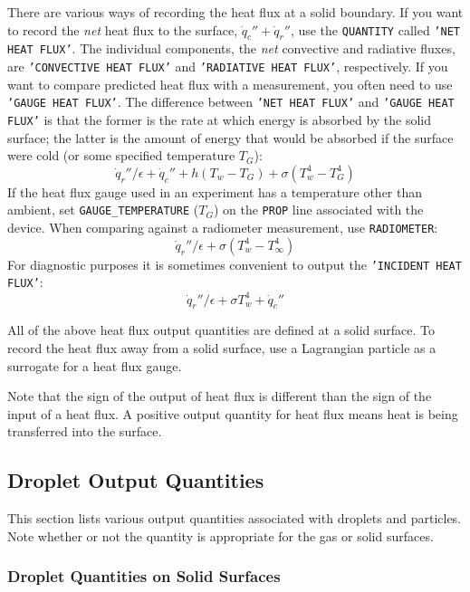 \documentclass[11pt]{book}
\newcommand{\ct}{\tt\small}
\newcommand{\dq}{\dot{q}}
\begin{document}
There are various ways of recording the heat flux at a solid
boundary. If you want to record the {\em net} heat flux to the
surface, $\dq_c'' + \dq_r''$, use the {\ct QUANTITY} called {\ct 'NET HEAT FLUX'}. The individual components, the {\em net} convective and
radiative fluxes, are {\ct 'CONVECTIVE HEAT FLUX'} and {\ct 'RADIATIVE HEAT FLUX'}, respectively. If you want to compare predicted heat
flux with a measurement, you often need to use {\ct 'GAUGE HEAT FLUX'}.
The difference between {\ct 'NET HEAT FLUX'} and {\ct 'GAUGE HEAT FLUX'} is that
the former is the rate at which energy is absorbed by the solid surface;
the latter is the amount of energy that would be absorbed if the surface were cold (or some specified temperature $T_G$):
$$\dq_r''/\epsilon +\dq_c'' + h(T_w-T_G) + \sigma (T_w^4-T_G^4)$$
If the heat flux gauge used in an experiment has a temperature other
than ambient, set {\ct GAUGE\_TEMPERATURE} ($T_G$) on the {\ct PROP} line
associated with the device.  When comparing against a radiometer
measurement, use {\ct RADIOMETER}:
$$\dq_r''/\epsilon + \sigma (T_w^4-T_\infty^4) $$
For diagnostic purposes it is sometimes convenient to output the {\ct 'INCIDENT HEAT FLUX'}:
$$ \dq_r''/\epsilon + \sigma T_w^4 +\dq_c'' $$

All of the above heat flux output quantities are defined at a solid surface. To record the heat flux away from a solid surface, use a Lagrangian particle as a surrogate for
a heat flux gauge.


Note that the sign of the output of heat flux is different than the sign of the input of a heat flux.  A positive
output quantity for heat flux means heat is being transferred into the surface.

\subsection{Droplet Output Quantities}
\label{info:part_output}

This section lists various output quantities associated with droplets and particles. Note whether or not the quantity is appropriate for the gas or
solid surfaces.

\subsubsection{Droplet Quantities on Solid Surfaces}
\end{document}
